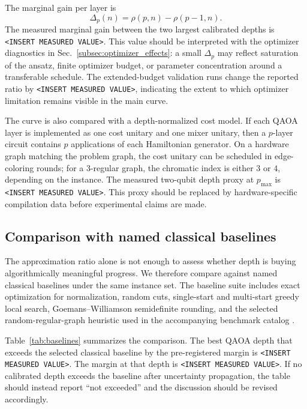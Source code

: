 \documentclass[reprint,aps,longbibliography]{revtex4-2}
\begin{document}
The marginal gain per layer is
\begin{equation}
  \Delta_p(n)=\rho(p,n)-\rho(p-1,n).
\end{equation}
The measured marginal gain between the two largest calibrated depths is \texttt{<INSERT MEASURED VALUE>}. This value should be interpreted with the optimizer diagnostics in Sec.~\ref{subsec:optimizer_effects}: a small $\Delta_p$ may reflect saturation of the ansatz, finite optimizer budget, or parameter concentration around a transferable schedule. The extended-budget validation runs change the reported ratio by \texttt{<INSERT MEASURED VALUE>}, indicating the extent to which optimizer limitation remains visible in the main curve.

The curve is also compared with a depth-normalized cost model. If each QAOA layer is implemented as one cost unitary and one mixer unitary, then a $p$-layer circuit contains $p$ applications of each Hamiltonian generator. On a hardware graph matching the problem graph, the cost unitary can be scheduled in edge-coloring rounds; for a 3-regular graph, the chromatic index is either $3$ or $4$, depending on the instance. The measured two-qubit depth proxy at $p_{\max}$ is \texttt{<INSERT MEASURED VALUE>}. This proxy should be replaced by hardware-specific compilation data before experimental claims are made.

\subsection{Comparison with named classical baselines}

The approximation ratio alone is not enough to assess whether depth is buying algorithmically meaningful progress. We therefore compare against named classical baselines under the same instance set. The baseline suite includes exact optimization for normalization, random cuts, single-start and multi-start greedy local search, Goemans--Williamson semidefinite rounding, and the selected random-regular-graph heuristic used in the accompanying benchmark catalog \cite{Goemans1995MaxCut,Barahona1988MaxCut,Montanari2019OptimizationRandomGraphs,Author2024ClassicalBaseline}.

Table~\ref{tab:baselines} summarizes the comparison. The best QAOA depth that exceeds the selected classical baseline by the pre-registered margin is \texttt{<INSERT MEASURED VALUE>}. The margin at that depth is \texttt{<INSERT MEASURED VALUE>}. If no calibrated depth exceeds the baseline after uncertainty propagation, the table should instead report ``not exceeded'' and the discussion should be revised accordingly.
\end{document}
